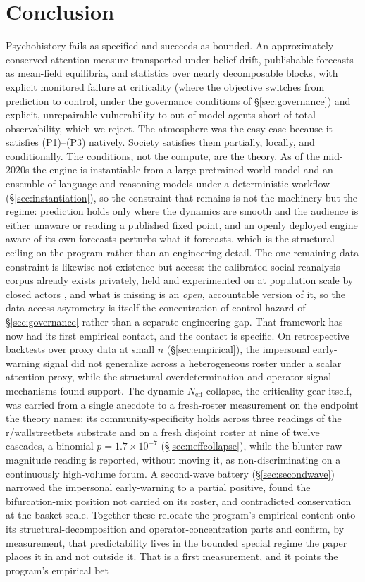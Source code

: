 \documentclass[11pt]{article}
\begin{document}
\section{Conclusion}

Psychohistory fails as specified and succeeds as bounded. An approximately conserved attention measure transported under belief drift, publishable forecasts as mean-field equilibria, and statistics over nearly decomposable blocks, with explicit monitored failure at criticality (where the objective switches from prediction to control, under the governance conditions of \S\ref{sec:governance}) and explicit, unrepairable vulnerability to out-of-model agents short of total observability, which we reject. The atmosphere was the easy case because it satisfies (P1)--(P3) natively. Society satisfies them partially, locally, and conditionally. The conditions, not the compute, are the theory. As of the mid-2020s the engine is instantiable from a large pretrained world model and an ensemble of language and reasoning models under a deterministic workflow (\S\ref{sec:instantiation}), so the constraint that remains is not the machinery but the regime: prediction holds only where the dynamics are smooth and the audience is either unaware or reading a published fixed point, and an openly deployed engine aware of its own forecasts perturbs what it forecasts, which is the structural ceiling on the program rather than an engineering detail. The one remaining data constraint is likewise not existence but access: the calibrated social reanalysis corpus already exists privately, held and experimented on at population scale by closed actors \cite{kramer2014}, and what is missing is an \emph{open}, accountable version of it, so the data-access asymmetry is itself the concentration-of-control hazard of \S\ref{sec:governance} rather than a separate engineering gap. That framework has now had its first empirical contact, and the contact is specific. On retrospective backtests over proxy data at small $n$ (\S\ref{sec:empirical}), the impersonal early-warning signal did not generalize across a heterogeneous roster under a scalar attention proxy, while the structural-overdetermination and operator-signal mechanisms found support. The dynamic $N_{\mathrm{eff}}$ collapse, the criticality gear itself, was carried from a single anecdote to a fresh-roster measurement on the endpoint the theory names: its community-specificity holds across three readings of the r/wallstreetbets substrate and on a fresh disjoint roster at nine of twelve cascades, a binomial $p=1.7\times10^{-7}$ (\S\ref{sec:neffcollapse}), while the blunter raw-magnitude reading is reported, without moving it, as non-discriminating on a continuously high-volume forum. A second-wave battery (\S\ref{sec:secondwave}) narrowed the impersonal early-warning to a partial positive, found the bifurcation-mix position not carried on its roster, and contradicted conservation at the basket scale. Together these relocate the program's empirical content onto its structural-decomposition and operator-concentration parts and confirm, by measurement, that predictability lives in the bounded special regime the paper places it in and not outside it. That is a first measurement, and it points the program's empirical bet 
\end{document}
